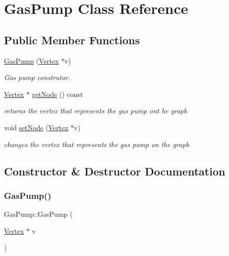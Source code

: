 \hypertarget{class_gas_pump}{}\section{Gas\+Pump Class Reference}
\label{class_gas_pump}
\subsection*{Public Member Functions}
\begin{DoxyCompactItemize}
\item 
\hyperlink{class_gas_pump_a077758ed7f7f3e563b448d81fbb8f9e7}{Gas\+Pump} (\hyperlink{class_vertex}{Vertex} $\ast$v)
\begin{DoxyCompactList}\small\item\em Gas pump construtor. \end{DoxyCompactList}\item 
\hyperlink{class_vertex}{Vertex} $\ast$ \hyperlink{class_gas_pump_a9e78404587c637783a1c437a0d0c1b4c}{get\+Node} () const
\begin{DoxyCompactList}\small\item\em returns the vertex that represents the gas pump ont he graph \end{DoxyCompactList}\item 
void \hyperlink{class_gas_pump_a6540af2cc7221b4395b411a5d6d8c66d}{set\+Node} (\hyperlink{class_vertex}{Vertex} $\ast$v)
\begin{DoxyCompactList}\small\item\em changes the vertex that represents the gas pump on the graph \end{DoxyCompactList}\end{DoxyCompactItemize}


\subsection{Constructor \& Destructor Documentation}
\hypertarget{class_gas_pump_a077758ed7f7f3e563b448d81fbb8f9e7}{}\label{class_gas_pump_a077758ed7f7f3e563b448d81fbb8f9e7} 
\subsubsection{\texorpdfstring{Gas\+Pump()}{GasPump()}}
{\footnotesize\ttfamily Gas\+Pump\+::\+Gas\+Pump (\begin{DoxyParamCaption}\item[{\hyperlink{class_vertex}{Vertex} $\ast$}]{v }\end{DoxyParamCaption})}




